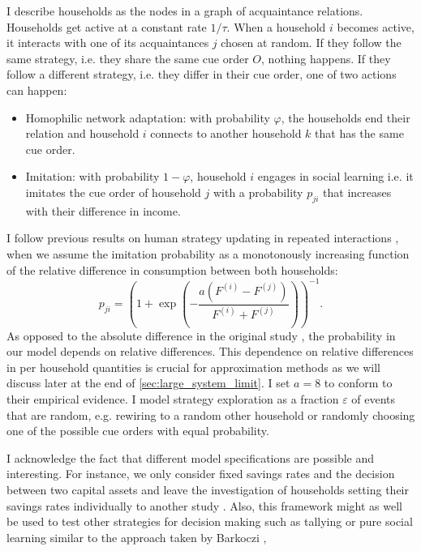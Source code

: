 I describe households as the nodes in a graph of acquaintance relations. Households get active at a constant rate $1/\tau$. When a household $i$ becomes active, it interacts with one of its acquaintances $j$ chosen at random. If they follow the same strategy, i.e. they share the same cue order $O$, nothing happens. If they follow a different strategy, i.e. they differ in their cue order, one of two actions can happen:
\begin{itemize}
	\item Homophilic network adaptation: with probability $\varphi$, the households end their relation and household $i$ connects to another household $k$ that has the same cue order. 
	\item Imitation: with probability $1-\varphi$, household $i$ engages in social learning i.e. it imitates the cue order of household $j$ with a probability $p_{ji}$ that increases with their difference in income.
\end{itemize}
I follow previous results on human strategy updating in repeated interactions \cite{Traulsen2010}, when we assume the imitation probability as a monotonously increasing function of the relative difference in consumption between both households:
\begin{equation}
	p_{ji} =  \left(1 + \exp \left(- \frac{a(F^{(i)} - F^{(j)})}{F^{(i)} + F^{(j)}} \right) \right)^{-1}.
    \label{eq:imitation_probability}
\end{equation}
As opposed to the absolute difference in the original study \cite{Traulsen2010}, the probability in our model depends on relative differences. This dependence on relative differences in per household quantities is crucial for approximation methods as we will discuss later at the end of \ref{sec:large_system_limit}.
I set $a = 8$ to conform to their empirical evidence.
I model strategy exploration as a fraction $\varepsilon$ of events that are random, e.g. rewiring to a random other household or randomly choosing one of the possible cue orders with equal probability.

I acknowledge the fact that different model specifications are possible and interesting.
For instance, we only consider fixed savings rates and the decision between two capital assets and leave the investigation of households setting their savings rates individually to another study \cite{Asano2018}.
Also, this framework might as well be used to test other strategies for decision making such as tallying or pure social learning similar to the approach taken by Barkoczi \cite{Barkoczi2013}, \cite{Barkoczi2016}

